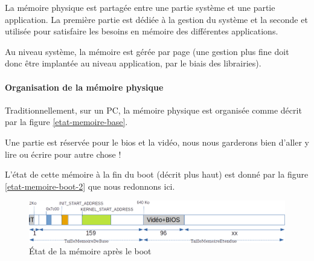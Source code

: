    La mémoire physique est partagée entre une partie système et une
partie application. La première partie est dédiée à la gestion du
système et la seconde et utilisée pour satisfaire les besoins en
mémoire des différentes applications.

   Au niveau système, la mémoire est gérée par page (une gestion plus
fine doit donc être implantée au niveau application, par le biais
des librairies).

%
%
%
\paragraph{Organisation de la mémoire physique}

   Traditionnellement, sur un PC, la mémoire physique est organisée
comme décrit par la figure \ref{etat-memoire-base}.

   Une partie est réservée pour le {\sc bios} et la vidéo, nous nous
garderons bien d'aller y lire ou écrire pour autre chose !
   
   L'état de cette mémoire à la fin du boot (décrit plus haut) est
donné  par la figure \ref{etat-memoire-boot-2} que nous redonnons ici.

\begin{figure}[htbp]
\includegraphics[width=\textwidth]{etat-memoire-boot}
\caption{\label{fig:etat-memoire-boot-2}État de la mémoire après le boot}
\end{figure} 

